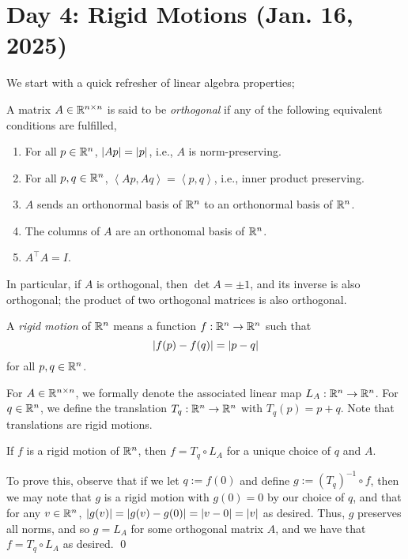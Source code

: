 \section{Day 4: Rigid Motions (Jan. 16, 2025)}
We start with a quick refresher of linear algebra properties;
\begin{definition}
    A matrix $A \in \mathbb R^{n \times n}$ is said to be \textit{orthogonal} if any of the following equivalent conditions are fulfilled,
    \begin{enumerate}[label=(\alph*)]
        \item For all $p \in \mathbb R^n$, $\left\lvert Ap \right\rvert = \left\lvert p \right\rvert$, i.e., $A$ is norm-preserving.
        \item For all $p, q \in \mathbb R^n$, $\left<Ap, Aq\right> = \left<p, q\right>$, i.e., inner product preserving.
        \item $A$ sends an orthonormal basis of $\mathbb R^n$ to an orthonormal basis of $\mathbb R^n$.
        \item The columns of $A$ are an orthonomal basis of $\mathbb R^n$.
        \item $A^{\top} A = I$.
    \end{enumerate}
\end{definition}
\noindent In particular, if $A$ is orthogonal, then $\det A = \pm 1$, and its inverse is also orthogonal; the product of two orthogonal matrices is also orthogonal.
\begin{definition}
    A \textit{rigid motion} of $\mathbb R^n$ means a function $f : \mathbb R^n \to \mathbb R^n$ such that
    \[ \left\lvert f(p) - f(q) \right\rvert = \left\lvert p - q \right\rvert \]
    for all $p, q \in \mathbb R^n$.
\end{definition}
\begin{definition}
    For $A \in \mathbb R^{n \times n}$, we formally denote the associated linear map $L_A : \mathbb R^n \to \mathbb R^n$. For $q \in \mathbb R^n$, we define the translation $T_q : \mathbb R^n \to \mathbb R^n$ with $T_q(p) = p + q$. Note that translations are rigid motions.
\end{definition}
\begin{simplethm}
    If $f$ is a rigid motion of $\mathbb R^n$, then $f = T_q \circ L_A$ for a unique choice of $q$ and $A$.
\end{simplethm}
\noindent To prove this, observe that if we let $q := f(0)$ and define $g := (T_q)^{-1} \circ f$, then we may note that $g$ is a rigid motion with $g(0) = 0$ by our choice of $q$, and that for any $v \in \mathbb R^n$, $\left\lvert g(v) \right\rvert = \left\lvert g(v) - g(0) \right\rvert = \left\lvert v - 0 \right\rvert = \left\lvert v \right\rvert$ as desired. Thus, $g$ preserves all norms, and so $g = L_A$ for some orthogonal matrix $A$, and we have that $f = T_q \circ L_A$ as desired. \qed
